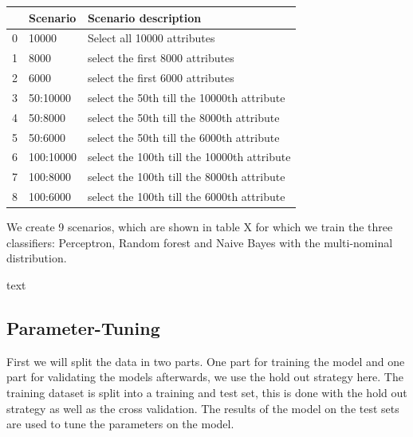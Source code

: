 \documentclass[11pt]{article}
\begin{document}
\begin{tabular}{lll}
\toprule
{} &   Scenario &  Scenario description \\
\midrule
0 &      10000 & Select all 10000 attributes   \\
1 &       8000 & select the first 8000 attributes  \\
2 &       6000 & select the first 6000 attributes   \\
3 &   50:10000 & select the 50th till the 10000th attribute   \\
4 &    50:8000 & select the 50th till the 8000th attribute    \\
5 &    50:6000 & select the 50th till the 6000th attribute    \\
6 &  100:10000 & select the 100th till the 10000th attribute    \\
7 &   100:8000 & select the 100th till the 8000th attribute    \\
8 &   100:6000 & select the 100th till the 6000th attribute	\\ 
\bottomrule
\end{tabular}

We create 9 scenarios, which are shown in table X for which we train the three classifiers: Perceptron, Random forest and Naive Bayes with the multi-nominal distribution.   


text
\subsection{Parameter-Tuning}
First we will split the data in two parts. One part for training the model and one part for validating the models afterwards, we use the hold out strategy here. The training dataset is split into a training and test set, this is done with the hold out strategy as well as the cross validation. The results of the model on the test sets are used to tune the parameters on the model.
\end{document}
